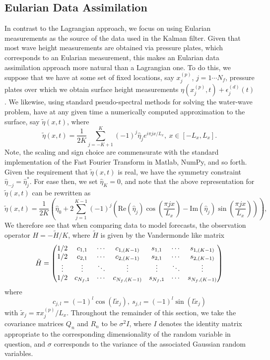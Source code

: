 \subsection*{Eularian Data Assimilation}
In contrast to the Lagrangian approach, we focus on using Eularian measurements as the source of the data used in the Kalman filter.  Given that most wave height measurements are obtained via pressure plates, which corresponds to an Eularian measurement, this makes an Eularian data assimilation approach more natural than a Lagrangian one.  To do this, we suppose that we have at some set of fixed locations, say $x^{(p)}_{j}$, $j=1\cdots N_{f}$, pressure plates over which we obtain surface height measurements $\eta(x^{(p)}_{j},t)+\epsilon^{(d)}_{j}(t)$.  We likewise, using standard pseudo-spectral methods for solving the water-wave problem, have at any given time a numerically computed approximation to the surface, say $\tilde{\eta}(x,t)$, where 
\[
\tilde{\eta}(x,t) = \frac{1}{2K}\sum_{j=-K+1}^{K}(-1)^{j}\hat{\eta}_{j}e^{i\pi jx/L_{x}}, ~ x \in [-L_{x},L_{x}].
\]
Note, the scaling and sign choice are commensurate with the standard implementation of the Fast Fourier Transform in Matlab, NumPy, and so forth.  Given the requirement that $\tilde{\eta}(x,t)$ is real, we have the symmetry constraint $\hat{\eta}_{-j} = \hat{\eta}^{\ast}_{j}$.  For ease then, we set $\hat{\eta}_{K}=0$, and note that the above representation for $\tilde{\eta}(x,t)$ can be rewritten as 
\[
\tilde{\eta}(x,t) = \frac{1}{2K}\left(\hat{\eta}_{0} + 2\sum_{j=1}^{K-1} (-1)^{j}\left( \mbox{Re}(\hat{\eta}_{j})\cos\left(\frac{\pi j x}{L_{x}}\right) -  \mbox{Im}(\hat{\eta}_{j})\sin\left(\frac{\pi j x}{L_{x}}\right)\right) \right), 
\]
We therefore see that when comparing data to model forecasts, the observation operator $H=-\tilde{H}/K$, where $\tilde{H}$ is given by the Vandermonde like matrix
\[
\tilde{H} =
\begin{pmatrix} 
1/2 & c_{1,1}  & \cdots & c_{1,(K-1)} & s_{1,1} & \cdots &  s_{1,(K-1)} \\  
1/2 & c_{2,1}  & \cdots & c_{2,(K-1)} & s_{2,1} & \cdots &  s_{2,(K-1)} \\
\vdots & \vdots & \ddots & \vdots & \vdots & \ddots & \vdots \\ 
1/2 & c_{N_{f},1}  & \cdots & c_{N_{f},(K-1)} & s_{N_{f},1} & \cdots &  s_{N_{f},(K-1)}
\end{pmatrix} 
\]
where
\[
c_{j,l} = (-1)^{l}\cos(l\tilde{x}_{j}), ~ s_{j,l} = (-1)^{l}\sin(l\tilde{x}_{j})
\]
with $\tilde{x}_{j} = \pi x^{(p)}_{j}/L_{x}$.  Throughout the remainder of this section, we take the covariance matrices $Q_{n}$ and $R_{n}$ to be $\sigma^{2}I$, where $I$ denotes the identity matrix appropriate to the corresponding dimensionality of the random variable in question, and $\sigma$ corresponds to the variance of the associated Gaussian random variables.  

